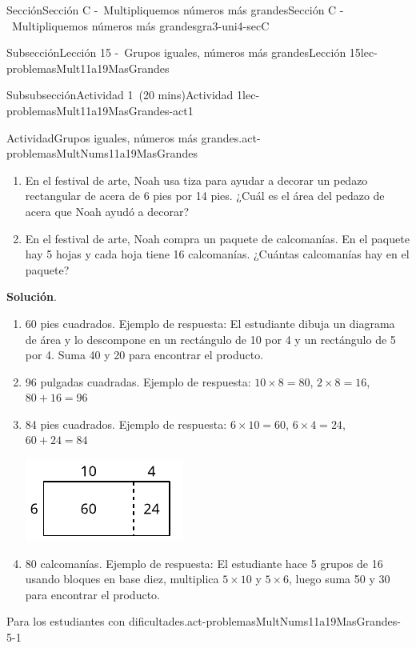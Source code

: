 \documentclass[oneside,10pt,]{article}
\newcommand{\blocktitlefont}{\relax}
\begin{document}
\begin{sectionptx}{Sección}{Sección C -~Multipliquemos números más grandes}{}{Sección C -~Multipliquemos números más grandes}{}{}{gra3-uni4-secC}
\begin{subsectionptx}{Subsección}{Lección 15 -~Grupos iguales, números más grandes}{}{Lección 15}{}{}{lec-problemasMult11a19MasGrandes}
\begin{subsubsectionptx}{Subsubsección}{Actividad 1~(20 mins)}{}{Actividad 1}{}{}{lec-problemasMult11a19MasGrandes-act1}
\begin{activity}{Actividad}{Grupos iguales, números más grandes.}{act-problemasMultNums11a19MasGrandes}
\begin{enumerate}
\item{}En el festival de arte, Noah usa tiza para ayudar a decorar un pedazo rectangular de acera de 6 pies por 14 pies. ¿Cuál es el área del pedazo de acera que Noah ayudó a decorar?%
\item{}En el festival de arte, Noah compra un paquete de calcomanías. En el paquete hay 5 hojas y cada hoja tiene 16 calcomanías. ¿Cuántas calcomanías hay en el paquete?%
\end{enumerate}
\par\smallskip%
\noindent\textbf{\blocktitlefont Solución}.\hypertarget{act-problemasMultNums11a19MasGrandes-3}{}\quad{}%
\begin{enumerate}
\item{}60 pies cuadrados. Ejemplo de respuesta: El estudiante dibuja un diagrama de área y lo descompone en un rectángulo de 10 por 4 y un rectángulo de 5 por 4. Suma 40 y 20 para encontrar el producto.%
\item{}96 pulgadas cuadradas. Ejemplo de respuesta: \(10 \times 8 = 80\), \(2 \times 8 = 16\), \(80 + 16 = 96\)%
\item{}84 pies cuadrados. Ejemplo de respuesta: \(6 \times 10 = 60\), \(6 \times 4= 24\), \(60 + 24 = 84\)%
\begin{image}{0}{1}{0}{}%
\includegraphics[width=\linewidth]{external/svg-source/tikz-file-141828.pdf}
\end{image}%
\item{}80 calcomanías. Ejemplo de respuesta: El estudiante hace 5 grupos de 16 usando bloques en base diez, multiplica \(5 \times 10\) y \(5 \times 6\), luego suma 50 y 30 para encontrar el producto.%
\end{enumerate}
\end{activity}%
\par
\begin{paragraphs}{Para los estudiantes con dificultades.}{act-problemasMultNums11a19MasGrandes-5-1}%

\end{paragraphs}
\end{subsubsectionptx}
\end{subsectionptx}
\end{sectionptx}
\end{document}
